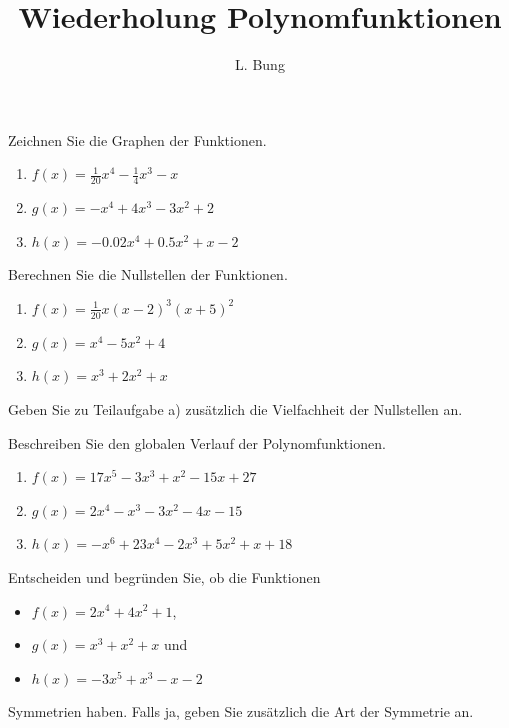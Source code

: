 \documentclass[11pt, a4paper, oneside]{article}
\begin{document}
	\author{L. Bung}
	\title{Wiederholung \hspace{10cm} Polynomfunktionen}
	\subject{Mathematik}
	\maketitle
	
	
	Zeichnen Sie die Graphen der Funktionen.
	
	\begin{enumerate}[label=\alph*)]
		\item $f(x) = \frac{1}{20} x^4 - \frac{1}{4}x^3 - x$
		\item $g(x) = -x^4 + 4x^3 - 3x^2 + 2$
		\item $h(x) = -0.02x^4 + 0.5x^2 + x - 2$
	\end{enumerate}
	
	
	
	Berechnen Sie die Nullstellen der Funktionen.
	
	\begin{enumerate}[label=\alph*)]
		\item $f(x) = \frac{1}{20}x(x-2)^3(x+5)^2$
		\item $g(x) = x^4 - 5x^2 + 4$
		\item $h(x) = x^3 + 2x^2 + x$
	\end{enumerate}
	
	Geben Sie zu Teilaufgabe a) zusätzlich die Vielfachheit der Nullstellen an.
	
	
	
	Beschreiben Sie den globalen Verlauf der Polynomfunktionen.
	
	\begin{enumerate}[label=\alph*)]
		\item $f(x) = 17x^5 - 3x^3 + x^2 - 15x + 27$
		\item $g(x) = 2x^4 - x^3 - 3x^2 - 4x - 15$
		\item $h(x) = -x^6 + 23x^4 - 2x^3 + 5x^2 + x + 18$
	\end{enumerate}
	
	
	
	Entscheiden und begründen Sie, ob die Funktionen
	\begin{itemize}
		\item[] $f(x) = 2x^4 + 4x^2 + 1$,
		\item[] $g(x) = x^3 + x^2 + x$ und
		\item[] $h(x) = -3x^5 + x^3 - x - 2$
	\end{itemize}
	Symmetrien haben.
	Falls ja, geben Sie zusätzlich die Art der Symmetrie an.
	
	
	\checkered[24cm]
\end{document}
